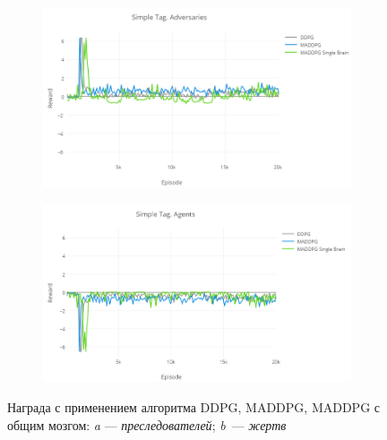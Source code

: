 \begin{figure}[!htbp]
    \begin{subfigure}[t]{\dimexpr.5\linewidth-1.3em\relax} %
        \includegraphics[height=0.19\textheight,valign=t]{my_folder/images/ch5/st-reward-ad.png} %
    \end{subfigure}
    \begin{subfigure}[t]{\dimexpr.5\linewidth-1.3em\relax}%
        \includegraphics[height=0.19\textheight,valign=t]{my_folder/images/ch5/st-reward-ag.png}%
    \end{subfigure}
    \captionsetup{justification=centering} %
    \caption{Награда с применением алгоритма DDPG, MADDPG, MADDPG с общим мозгом: {\itshape a} --- \textit{преследователей}; {\itshape b}~--- \textit{жертв}}\label{fig:spbpu_main_bld-two-photos}
\end{figure}

